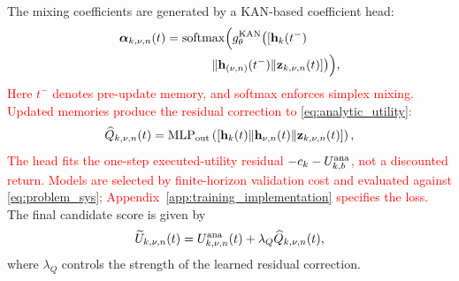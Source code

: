 \documentclass[10pt,letterpaper,journal]{IEEEtran}
\newcommand{\revnew}[1]{\textcolor{red}{#1}}
\begin{document}
The mixing coefficients are generated by a KAN-based coefficient head:
\begin{equation}
\begin{aligned}
\boldsymbol\alpha_{k,\nu,n}(t)=\mathrm{softmax}\Bigl(g^{\rm KAN}_\theta\bigl(
[&\mathbf{h}_k(t^-)\\
\Vert\mathbf{h}_{(\nu,n)}(t^-)&\Vert\mathbf{z}_{k,\nu,n}(t)]\bigr)\Bigr),
\end{aligned}   
\label{eq:alpha_main}
\end{equation}
\revnew{Here $t^-$ denotes pre-update memory, and softmax enforces simplex mixing. Updated memories produce the residual correction to \eqref{eq:analytic_utility}:}
\begin{equation}
\widehat Q_{k,\nu,n}(t)
=
{\rm MLP}_{\rm out}
\left(
[
\mathbf h_k(t)
\Vert
\mathbf h_{\nu,n}(t)
\Vert
\mathbf z_{k,\nu,n}(t)
]
\right),
\label{eq:residual_score}
\end{equation}
\revnew{The head fits the one-step executed-utility residual $-c_k-U^{\rm ana}_{k,b}$, not a discounted return. Models are selected by finite-horizon validation cost and evaluated against \eqref{eq:problem_sys}; Appendix~\ref{app:training_implementation} specifies the loss.}
The final candidate score is given by
\begin{equation}
\widetilde{U}_{k,\nu,n}(t)
=
U^{\rm ana}_{k,\nu,n}(t)
+
\lambda_Q \widehat Q_{k,\nu,n}(t),
\label{eq:U_final_main}
\end{equation}
where $\lambda_Q$ controls the strength of the learned residual correction.

\end{document}
